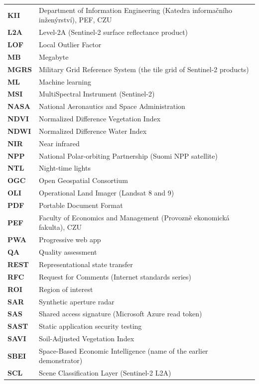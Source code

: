 {\begin{longtable}{>{\raggedright\arraybackslash}p{3.68cm}>{\raggedright\arraybackslash}p{10.52cm}}
\textbf{KII} & Department of Information Engineering (Katedra informačního inženýrství), PEF, CZU \\
\textbf{L2A} & Level-2A (Sentinel-2 surface reflectance product) \\
\textbf{LOF} & Local Outlier Factor \\
\textbf{MB} & Megabyte \\
\textbf{MGRS} & Military Grid Reference System (the tile grid of Sentinel-2 products) \\
\textbf{ML} & Machine learning \\
\textbf{MSI} & MultiSpectral Instrument (Sentinel-2) \\
\textbf{NASA} & National Aeronautics and Space Administration \\
\textbf{NDVI} & Normalized Difference Vegetation Index \\
\textbf{NDWI} & Normalized Difference Water Index \\
\textbf{NIR} & Near infrared \\
\textbf{NPP} & National Polar-orbiting Partnership (Suomi NPP satellite) \\
\textbf{NTL} & Night-time lights \\
\textbf{OGC} & Open Geospatial Consortium \\
\textbf{OLI} & Operational Land Imager (Landsat 8 and 9) \\
\textbf{PDF} & Portable Document Format \\
\textbf{PEF} & Faculty of Economics and Management (Provozně ekonomická fakulta), CZU \\
\textbf{PWA} & Progressive web app \\
\textbf{QA} & Quality assessment \\
\textbf{REST} & Representational state transfer \\
\textbf{RFC} & Request for Comments (Internet standards series) \\
\textbf{ROI} & Region of interest \\
\textbf{SAR} & Synthetic aperture radar \\
\textbf{SAS} & Shared access signature (Microsoft Azure read token) \\
\textbf{SAST} & Static application security testing \\
\textbf{SAVI} & Soil-Adjusted Vegetation Index \\
\textbf{SBEI} & Space-Based Economic Intelligence (name of the earlier demonstrator) \\
\textbf{SCL} & Scene Classification Layer (Sentinel-2 L2A) \\

\end{longtable}}
